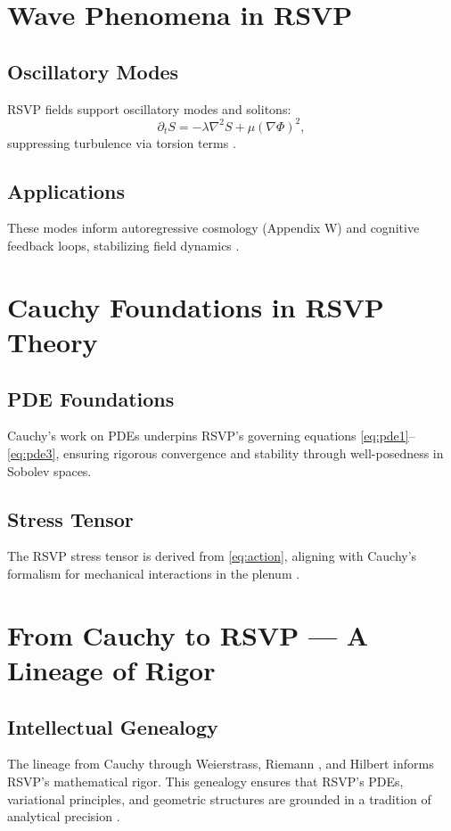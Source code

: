 \documentclass[12pt]{report}
\newcommand{\PhiRSVP}{\Phi}
\newcommand{\SRSVP}{S}
\begin{document}
\chapter{Wave Phenomena in RSVP}
\label{app:W}
\section{Oscillatory Modes}
RSVP fields support oscillatory modes and solitons:
\begin{equation}
\partial_t \SRSVP = -\lambda \nabla^2 \SRSVP + \mu (\nabla \PhiRSVP)^2, \label{eq:appW_wave}
\end{equation}
suppressing turbulence via torsion terms \citep{RSVPMeta2025}.

\section{Applications}
These modes inform autoregressive cosmology (Appendix W) and cognitive feedback loops, stabilizing field dynamics \citep{Flyxion2025}.

\chapter{Cauchy Foundations in RSVP Theory}
\label{app:X}
\section{PDE Foundations}
Cauchy’s work on PDEs \citep{Cauchy1821} underpins RSVP’s governing equations \eqref{eq:pde1}--\eqref{eq:pde3}, ensuring rigorous convergence and stability through well-posedness in Sobolev spaces.

\section{Stress Tensor}
The RSVP stress tensor is derived from \eqref{eq:action}, aligning with Cauchy’s formalism for mechanical interactions in the plenum \citep{RSVPMeta2025}.

\chapter{From Cauchy to RSVP — A Lineage of Rigor}
\label{app:Y}
\section{Intellectual Genealogy}
The lineage from Cauchy \citep{Cauchy1821} through Weierstrass, Riemann \citep{Riemann1854}, and Hilbert \citep{Hilbert1900} informs RSVP’s mathematical rigor. This genealogy ensures that RSVP’s PDEs, variational principles, and geometric structures are grounded in a tradition of analytical precision \citep{RSVPMeta2025}.
\end{document}

